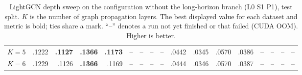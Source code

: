 \documentclass[11pt]{article}
\begin{document}
\begin{table}[!t]
{\begin{tabular}{l*{4}{rrrr}}
        $K=5$ & .1222 & \textbf{.1127} & \textbf{.1366} & \textbf{.1173} & -- & -- & -- & -- & .0442 & .0345 & .0570 & .0386 & -- & -- & -- & -- \\
        $K=6$ & .1229 & .1126 & \textbf{.1366} & .1169 & -- & -- & -- & -- & .0444 & .0346 & .0570 & .0387 & -- & -- & -- & -- \\
        \bottomrule
    \end{tabular}%
    }
    \caption{LightGCN depth sweep on the configuration without the
    long-horizon branch (L0 S1 P1), test split. $K$ is the number of graph propagation
    layers. The best displayed value for each dataset and metric is bold; ties share a mark. ``--'' denotes a run not yet
    finished or that failed (CUDA OOM). Higher is better.}
    \label{tab:graphlayers}
\end{table}
\end{document}
